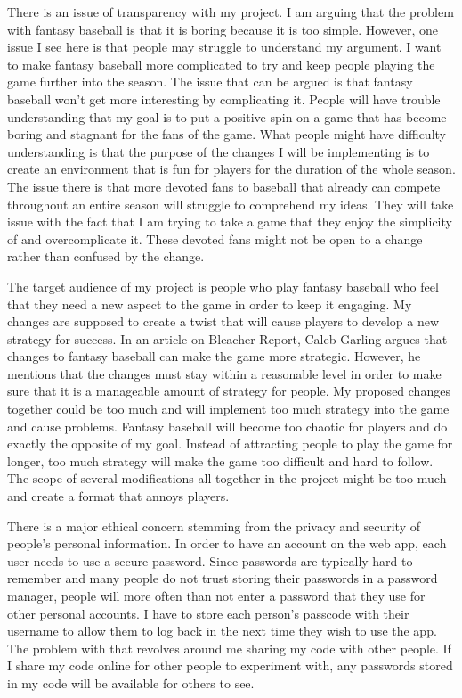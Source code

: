 \documentclass[12pt, twocolumn]{article}
\begin{document}
There is an issue of transparency with my project. I am arguing that the problem with fantasy baseball is that it is boring because it is too simple. However, one issue I see here is that people may struggle to understand my argument. I want to make fantasy baseball more complicated to try and keep people playing the game further into the season. The issue that can be argued is that fantasy baseball won't get more interesting by complicating it. People will have trouble understanding that my goal is to put a positive spin on a game that has become boring and stagnant for the fans of the game. What people might have difficulty understanding is that the purpose of the changes I will be implementing is to create an environment that is fun for players for the duration of the whole season. The issue there is that more devoted fans to baseball that already can compete throughout an entire season will struggle to comprehend my ideas. They will take issue with the fact that I am trying to take a game that they enjoy the simplicity of and overcomplicate it. These devoted fans might not be open to a change rather than confused by the change. 

The target audience of my project is people who play fantasy baseball who feel that they need a new aspect to the game in order to keep it engaging. My changes are supposed to create a twist that will cause players to develop a new strategy for success. In an article on Bleacher Report, Caleb Garling argues that changes to fantasy baseball can make the game more strategic. However, he mentions that the changes must stay within a reasonable level in order to make sure that it is a manageable amount of strategy for people. My proposed changes together could be too much and will implement too much strategy into the game and cause problems. Fantasy baseball will become too chaotic for players and do exactly the opposite of my goal. Instead of attracting people to play the game for longer, too much strategy will make the game too difficult and hard to follow. The scope of several modifications all together in the project might be too much and create a format that annoys players. 

There is a major ethical concern stemming from the privacy and security of people's personal information. In order to have an account on the web app, each user needs to use a secure password. Since passwords are typically hard to remember and many people do not trust storing their passwords in a password manager, people will more often than not enter a password that they use for other personal accounts. I have to store each person's passcode with their username to allow them to log back in the next time they wish to use the app. The problem with that revolves around me sharing my code with other people. If I share my code online for other people to experiment with, any passwords stored in my code will be available for others to see.
\end{document}
